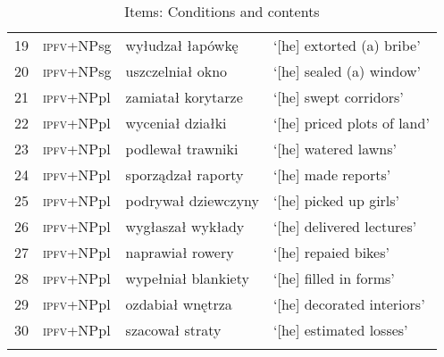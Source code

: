 \documentclass[output=paper]{langscibook}
\begin{document}
\begin{table}[H]
\begin{tabular}{rlll}
19& \textsc{ipfv}+NPsg&wyłudzał łapówkę&   `[he] extorted (a) bribe'\\          
20& \textsc{ipfv}+NPsg&uszczelniał okno&   `[he] sealed (a) window'\\           
21& \textsc{ipfv}+NPpl&zamiatał korytarze&   `[he] swept corridors'\\           
22& \textsc{ipfv}+NPpl&wyceniał działki&   `[he] priced plots of land'\\        
23& \textsc{ipfv}+NPpl&podlewał trawniki&   `[he] watered lawns'\\              
24& \textsc{ipfv}+NPpl&sporządzał raporty&   `[he] made reports'\\              
25& \textsc{ipfv}+NPpl&podrywał dziewczyny&   `[he] picked up girls'\\          
26& \textsc{ipfv}+NPpl&wygłaszał wykłady&   `[he] delivered lectures'\\         
27& \textsc{ipfv}+NPpl&naprawiał rowery&   `[he] repaied bikes'\\               
28& \textsc{ipfv}+NPpl&wypełniał blankiety&   `[he] filled in forms'\\          
29& \textsc{ipfv}+NPpl&ozdabiał wnętrza&   `[he] decorated interiors'\\         
30& \textsc{ipfv}+NPpl&szacował straty&   `[he] estimated losses'\\             
\lspbottomrule
    \end{tabular}
    \caption{Items: Conditions and contents}
    \label{jan-bla:fansb:kb:tab4}
\end{table}

\pagebreak
\end{document}

